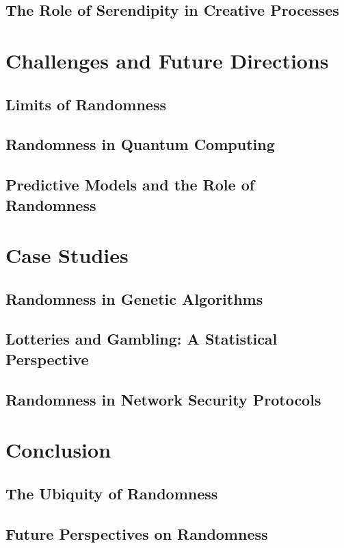 \documentclass[12pt]{book} %
\begin{document}
\subsection{The Role of Serendipity in Creative Processes}

\section{Challenges and Future Directions}
\subsection{Limits of Randomness}
\subsection{Randomness in Quantum Computing}
\subsection{Predictive Models and the Role of Randomness}

\section{Case Studies}
\subsection{Randomness in Genetic Algorithms}
\subsection{Lotteries and Gambling: A Statistical Perspective}
\subsection{Randomness in Network Security Protocols}

\section{Conclusion}
\subsection{The Ubiquity of Randomness}
\subsection{Future Perspectives on Randomness}
\end{document}
